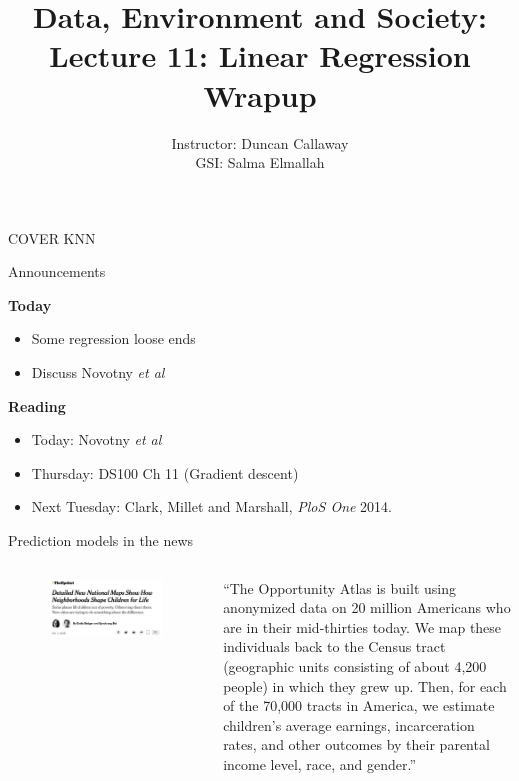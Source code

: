 \documentclass[aspectratio=169]{beamer}
\title[Lecture 11: Regression wrapup] %
{Data, Environment and Society: \\{Lecture 11: Linear Regression Wrapup}}
\author[ER131: Data, Environment and Society] 
{Instructor: Duncan Callaway\\
GSI: Salma Elmallah}
\institute[UC Berkeley] %
 {\small{ \bf October 3, 2019}}
\date[October 3, 2019]
\begin{document}
\begin{frame}
  \titlepage
\end{frame}

\begin{frame}

COVER KNN 

\end{frame}

\begin{frame}{Announcements}

\textbf{Today}
\begin{itemize}
\item Some regression loose ends
\item Discuss Novotny \textit{et al}
\end{itemize}

\textbf{Reading}
\begin{itemize}
\item Today: Novotny \textit{et al}
\item Thursday: DS100 Ch 11 (Gradient descent)
\item Next Tuesday: Clark, Millet and Marshall, \textit{PloS One} 2014.
\end{itemize}
\end{frame}


\begin{frame}{Prediction models in the news}

\begin{columns}
\begin{figure}
\includegraphics[width=\textwidth]{NYT_poverty_maps}
\caption*{}
\end{figure}
``The Opportunity Atlas is built using anonymized data on 20 million Americans who are in their mid-thirties today. We map these individuals back to the Census tract (geographic units consisting of about 4,200 people) in which they grew up. Then, for each of the 70,000 tracts in America, we estimate children's average earnings, incarceration rates, and other outcomes by their parental income level, race, and gender.''
\end{columns}
\end{frame}
\end{document}
